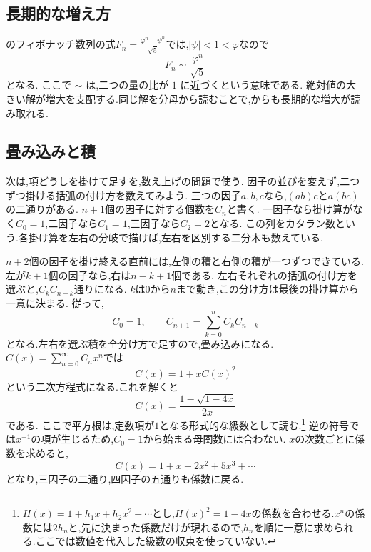 
\subsection{長期的な増え方}
のフィボナッチ数列の式$F_n=\frac{\varphi^n-\psi^n}{\sqrt5}$では,$|\psi|<1<\varphi$なので
\[
  F_n\sim\frac{\varphi^n}{\sqrt5}
\]
となる.
ここで $\sim$ は,二つの量の比が $1$ に近づくという意味である.
絶対値の大きい解が増大を支配する.同じ解を分母から読むことで,からも長期的な増大が読み取れる.

\subsection{畳み込みと積}
次は,項どうしを掛けて足すを,数え上げの問題で使う.
因子の並びを変えず,二つずつ掛ける括弧の付け方を数えてみよう.
三つの因子$a,b,c$なら,$(ab)c$と$a(bc)$の二通りがある.
$n+1$個の因子に対する個数を$C_n$と書く.
一因子なら掛け算がなく$C_0=1$,二因子なら$C_1=1$,三因子なら$C_2=2$となる.
この列をカタラン数という.各掛け算を左右の分岐で描けば,左右を区別する二分木も数えている.

$n+2$個の因子を掛け終える直前には,左側の積と右側の積が一つずつできている.
左が$k+1$個の因子なら,右は$n-k+1$個である.
左右それぞれの括弧の付け方を選ぶと,$C_kC_{n-k}$通りになる.
$k$は$0$から$n$まで動き,この分け方は最後の掛け算から一意に決まる.
従って,
\[
  C_0=1,\qquad C_{n+1}=\sum_{k=0}^{n}C_kC_{n-k}
\]
となる.左右を選ぶ積を全分け方で足すので,畳み込みになる.
$C(x)=\sum_{n=0}^{\infty}C_nx^n$では
\[
  C(x)=1+xC(x)^2
\]
という二次方程式になる.これを解くと
\[
  C(x)=\frac{1-\sqrt{1-4x}}{2x}
\]
である.
ここで平方根は,定数項が$1$となる形式的な級数として読む.\footnote{$H(x)=1+h_1x+h_2x^2+\cdots$とし,$H(x)^2=1-4x$の係数を合わせる.$x^n$の係数には$2h_n$と,先に決まった係数だけが現れるので,$h_n$を順に一意に求められる.ここでは数値を代入した級数の収束を使っていない.}
逆の符号では$x^{-1}$の項が生じるため,$C_0=1$から始まる母関数には合わない.
$x$の次数ごとに係数を求めると,
\[
  C(x)=1+x+2x^2+5x^3+\cdots
\]
となり,三因子の二通り,四因子の五通りも係数に戻る.

